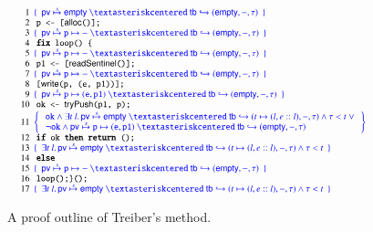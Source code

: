 \begin{wrapfigure}[17]{r}{6.8cm} 
\centering
\begin{minipage}[l]{6.8cm}
\[
{\scriptsize
\hspace{-5pt}
~~\begin{array}{r@{\ \ }ll}
  \Num{1}& \sspec{~~\hpriv \spts \hempty ~\sep~ \histso{\htb}{\hempty, -, \hist}~~} & 
  \\
  \Num{2} &  ~\esc{p <- [\act{alloc}()];}~ & 
  \\
  \Num{3} & \sspec{~~\hpriv \spts \esc{p} \hpts - ~\sep~ \histso{\htb}{\hempty, -, \hist}~~}
  \\
  \Num{4} &  ~\esc{\textbf{fix} loop() \{}~ & 
  \\
  \Num{5}& \sspec{~~\hpriv \spts \esc{p} \hpts - ~\sep~ \histso{\htb}{\hempty, -, \hist}~~}
  \\
  \Num{6} &  ~\esc{p1 <- [\act{readSentinel}()];}~ & 
  \\
  \Num{7}& \sspec{~~
     \hpriv \spts \esc{p} \hpts - ~\sep~
     \histso{\htb}{\hempty, -, \hist}
  ~~} 
  \\
  \Num{8} &  ~\esc{[\act{write}(p, (e, p1))];}~ & 
  \\
  \Num{9}& \sspec{~~
     \hpriv \spts \esc{p} \hpts (\esc{e}, \esc{p1}) ~\sep~
     \histso{\htb}{\hempty, -, \hist} 
  ~~} 
  \\
  \Num{10} &  ~\esc{ok <- \act{tryPush}(p1, p);}~ & 
  \\[1pt]
  \Num{11}& \spec{
    \begin{array}{l}
     \esc{ok} \aand \exists t\ l\ldot \hpriv \spts \hempty ~\sep~
     \histso{\htb}{t \hpts (l,e::l), -, \hist}\aand 
     \hist < t~\oor\\
     \neg\esc{ok} \aand 
     \hpriv \spts \esc{p} \hpts (\esc{e}, \esc{p1}) ~\sep~ \histso{\htb}{\hempty, -, \hist}
    \end{array}
  } 
  \\
  \Num{12} &  ~\esc{\textbf{if} ok \textbf{then return} ();}~ & 
  \\
  \Num{13}&\sspec{~~\exists t\ l\ldot
     \hpriv \spts \hempty  ~\sep~\histso{\htb}{t \hpts (l,e::l), -, \hist} \aand \hist < t ~~}
  \\
  \Num{14} &  ~\esc{\textbf{else}}~ & 
  \\
  \Num{15} &  
  \sspec{~~\hpriv \spts \esc{p} \hpts - ~\sep~ \histso{\htb}{\hempty, -, \hist}~~}& 
  \\
  \Num{16} &  ~\esc{loop();\}();}~ & 
  \\
  \Num{17}&\sspec{~~\exists t\ l\ldot
     \hpriv \spts \hempty  ~\sep~ \histso{\htb}{t \hpts (l,e::l), -, \hist} \aand \hist < t ~~}
\end{array}
}
\]
\end{minipage}
\caption{A proof outline of Treiber's  method.}
\label{fig:push-proof}
\end{wrapfigure}
